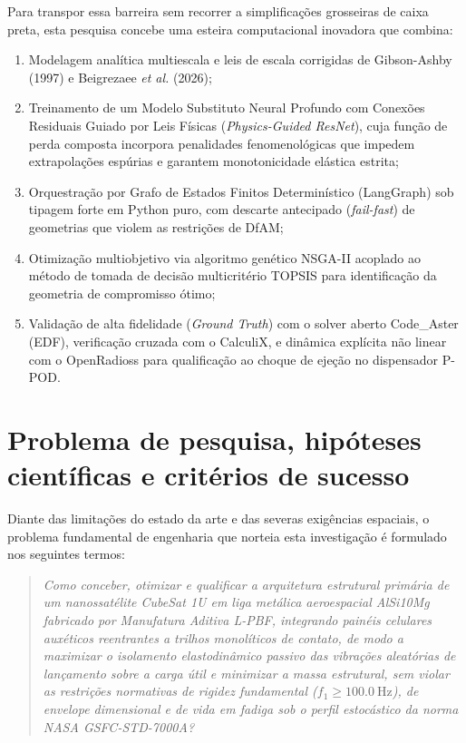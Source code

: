 Para transpor essa barreira sem recorrer a simplificações grosseiras de caixa preta, esta pesquisa concebe uma esteira computacional inovadora que combina:
\begin{enumerate}
  \item Modelagem analítica multiescala e leis de escala corrigidas de Gibson-Ashby (1997) e Beigrezaee \textit{et al.} (2026);
  \item Treinamento de um Modelo Substituto Neural Profundo com Conexões Residuais Guiado por Leis Físicas (\textit{Physics-Guided ResNet}), cuja função de perda composta incorpora penalidades fenomenológicas que impedem extrapolações espúrias e garantem monotonicidade elástica estrita;
  \item Orquestração por Grafo de Estados Finitos Determinístico (LangGraph) sob tipagem forte em Python puro, com descarte antecipado (\textit{fail-fast}) de geometrias que violem as restrições de DfAM;
  \item Otimização multiobjetivo via algoritmo genético NSGA-II acoplado ao método de tomada de decisão multicritério TOPSIS para identificação da geometria de compromisso ótimo;
  \item Validação de alta fidelidade (\textit{Ground Truth}) com o solver aberto Code\_Aster (EDF), verificação cruzada com o CalculiX, e dinâmica explícita não linear com o OpenRadioss para qualificação ao choque de ejeção no dispensador P-POD.
\end{enumerate}

\section{Problema de pesquisa, hipóteses científicas e critérios de sucesso}
\label{sec:intro-problema}

Diante das limitações do estado da arte e das severas exigências espaciais, o problema fundamental de engenharia que norteia esta investigação é formulado nos seguintes termos:
\begin{quote}
  \textit{Como conceber, otimizar e qualificar a arquitetura estrutural primária de um nanossatélite CubeSat 1U em liga metálica aeroespacial AlSi10Mg fabricado por Manufatura Aditiva L-PBF, integrando painéis celulares auxéticos reentrantes a trilhos monolíticos de contato, de modo a maximizar o isolamento elastodinâmico passivo das vibrações aleatórias de lançamento sobre a carga útil e minimizar a massa estrutural, sem violar as restrições normativas de rigidez fundamental ($f_1 \ge \SI{100.0}{\hertz}$), de envelope dimensional e de vida em fadiga sob o perfil estocástico da norma NASA GSFC-STD-7000A?}
\end{quote}


